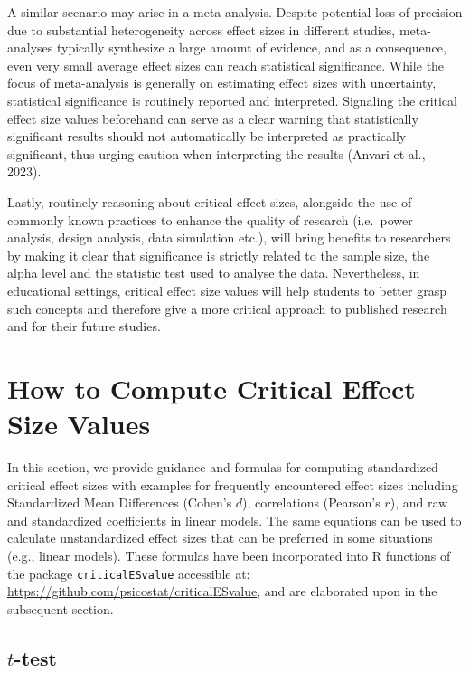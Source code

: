 \documentclass[
  man,floatsintext]{apa7}
\begin{document}
A similar scenario may arise in a meta-analysis. Despite potential loss of precision due to substantial heterogeneity across effect sizes in different studies, meta-analyses typically synthesize a large amount of evidence, and as a consequence, even very small average effect sizes can reach statistical significance. While the focus of meta-analysis is generally on estimating effect sizes with uncertainty, statistical significance is routinely reported and interpreted. Signaling the critical effect size values beforehand can serve as a clear warning that statistically significant results should not automatically be interpreted as practically significant, thus urging caution when interpreting the results (Anvari et al., 2023).

Lastly, routinely reasoning about critical effect sizes, alongside the use of commonly known practices to enhance the quality of research (i.e.~power analysis, design analysis, data simulation etc.), will bring benefits to researchers by making it clear that significance is strictly related to the sample size, the alpha level and the statistic test used to analyse the data. Nevertheless, in educational settings, critical effect size values will help students to better grasp such concepts and therefore give a more critical approach to published research and for their future studies.

\hypertarget{how-to-compute-critical-effect-size-values}{%
\section{How to Compute Critical Effect Size Values}\label{how-to-compute-critical-effect-size-values}}

In this section, we provide guidance and formulas for computing standardized critical effect sizes with examples for frequently encountered effect sizes including Standardized Mean Differences (Cohen's \(d\)), correlations (Pearson's \(r\)), and raw and standardized coefficients in linear models. The same equations can be used to calculate unstandardized effect sizes that can be preferred in some situations (e.g., linear models). These formulas have been incorporated into R functions of the package \texttt{criticalESvalue} accessible at: \url{https://github.com/psicostat/criticalESvalue}, and are elaborated upon in the subsequent section.

\hypertarget{t-test}{%
\subsection{\texorpdfstring{\(t\)-test}{t-test}}\label{t-test}}
\end{document}
